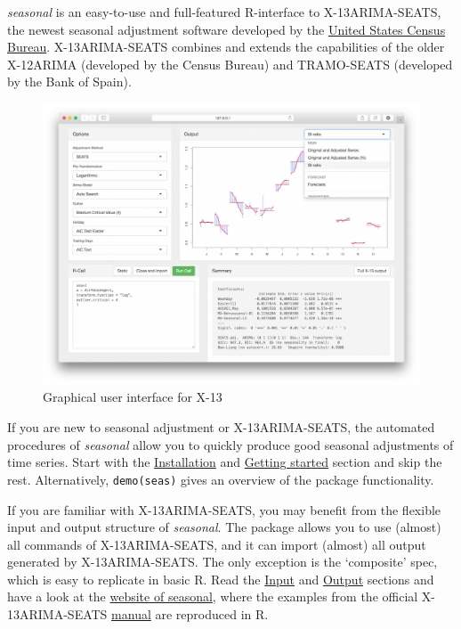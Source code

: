 \emph{seasonal} is an easy-to-use and full-featured R-interface to
X-13ARIMA-SEATS, the newest seasonal adjustment software developed by
the \href{http://www.census.gov/srd/www/x13as/}{United States Census
Bureau}. X-13ARIMA-SEATS combines and extends the capabilities of the
older X-12ARIMA (developed by the Census Bureau) and TRAMO-SEATS
(developed by the Bank of Spain).

\begin{figure}[htbp]
\centering
\includegraphics[width=\textwidth]{images/inspect.jpg}
\caption{Graphical user interface for X-13}
\end{figure}

If you are new to seasonal adjustment or X-13ARIMA-SEATS, the automated
procedures of \emph{seasonal} allow you to quickly produce good seasonal
adjustments of time series. Start with the
\hyperref[installation]{Installation} and
\hyperref[getting-started]{Getting started} section and skip the rest.
Alternatively, \texttt{demo(seas)} gives an overview of the package
functionality.

If you are familiar with X-13ARIMA-SEATS, you may benefit from the
flexible input and output structure of \emph{seasonal}. The package
allows you to use (almost) all commands of X-13ARIMA-SEATS, and it can
import (almost) all output generated by X-13ARIMA-SEATS. The only
exception is the `composite' spec, which is easy to replicate in basic
R. Read the \hyperref[input]{Input} and \hyperref[output]{Output}
sections and have a look at the
\href{http://www.seasonal.website/examples.html}{website of seasonal},
where the examples from the official X-13ARIMA-SEATS
\href{http://www.census.gov/ts/x13as/docX13ASHTML.pdf}{manual} are
reproduced in R.

